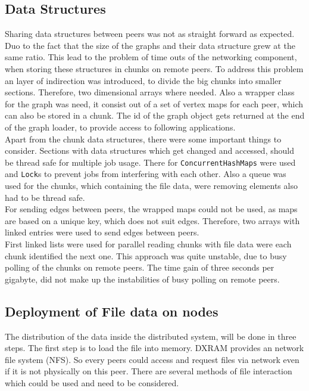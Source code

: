 \subsection{Data Structures}
Sharing data structures between peers was not as straight forward as expected. Duo to the fact that the size of the graphs and their data structure grew at the same ratio. This lead to the problem of time outs of the networking component, when storing these structures in chunks on remote peers. To address this problem an layer of indirection was introduced, to divide the big chunks into smaller sections. Therefore, two dimensional arrays where needed. 
Also a wrapper class for the graph was need, it consist out of a set of vertex maps for each peer, which can also be stored in a chunk. The id of the graph object gets returned at the end of the graph loader, to provide access to following applications.\\
Apart from the chunk data structures, there were some important things to consider. Sections with data structures which get changed and accessed, should be thread safe for multiple job usage. There for \texttt{ConcurrentHashMaps} were used and \texttt{Lock}s to prevent jobs from interfering with each other. Also a queue was used for the chunks, which containing the file data, were removing elements also had to be thread safe.\\
For sending edges between peers, the wrapped maps could not be used, as maps are based on a unique key, which does not suit edges. Therefore, two arrays with linked entries were used to send edges between peers.\\
First linked lists were used for parallel reading chunks with file data were each chunk identified the next one. This approach was quite unstable, due to busy polling of the chunks on remote peers. The time gain of three seconds per gigabyte, did not make up the instabilities of busy polling on remote peers.\\

\subsection{Deployment of File data on nodes}
The distribution of the data inside the distributed system, will be done in three steps. The first step is to load the file into memory. DXRAM provides an network file system (NFS). So every peers could access and request files via network even if it is not physically on this peer. There are several methods of file interaction which could be used and need to be considered.

